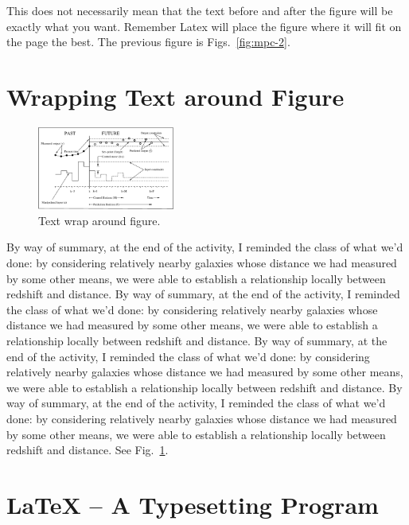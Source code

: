 \renewcommand{\baselinestretch}{2}
\large\normalsize

This does not necessarily mean that the text before and after the figure will be exactly what you want.  Remember Latex will place the figure where it will fit on the page the best.   The previous figure is Figs.~\ref{fig:mpc-2}. 

\section{Wrapping Text around Figure}


\renewcommand{\baselinestretch}{1}
\begin{figure}
\includegraphics[width=0.4\textwidth]{mpc}
\caption{ Text wrap around figure. \label{fig:test}}
\end{figure}

\renewcommand{\baselinestretch}{2}
\large\normalsize

By way of summary, at the end of the activity, I reminded the class of what we'd done:  by considering relatively nearby galaxies whose distance we had measured by some other means, we were able to establish a relationship locally between redshift and distance.  
By way of summary, at the end of the activity, I reminded the class of what we'd done:  by considering relatively nearby galaxies whose distance we had measured by some other means, we were able to establish a relationship locally between redshift and distance.  
By way of summary, at the end of the activity, I reminded the class of what we'd done:  by considering relatively nearby galaxies whose distance we had measured by some other means, we were able to establish a relationship locally between redshift and distance.  
By way of summary, at the end of the activity, I reminded the class of what we'd done:  by considering relatively nearby galaxies whose distance we had measured by some other means, we were able to establish a relationship locally between redshift and distance.  See Fig.~\ref{fig:test}.


\section{LaTeX -- A Typesetting Program}

